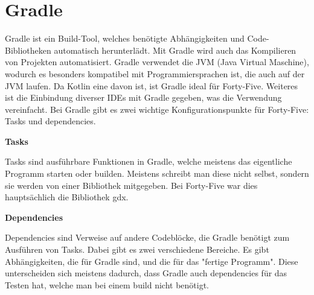 
\renewcommand{\kapitelautor}{Autor: Felix Zwickelstorfer}
\section{Gradle}\label{sec:gradle}

\renewcommand{\kapitelautor}{Autor: Felix Zwickelstorfer}

Gradle ist ein Build-Tool, welches benötigte Abhängigkeiten und Code-Bibliotheken automatisch herunterlädt.
Mit Gradle wird auch das Kompilieren von Projekten automatisiert.
Gradle verwendet die JVM (Java Virtual Maschine), wodurch es besonders kompatibel mit Programmiersprachen ist, die auch auf der JVM laufen.
Da Kotlin eine davon ist, ist Gradle ideal für Forty-Five.
Weiteres ist die Einbindung diverser IDEs mit Gradle gegeben, was die Verwendung vereinfacht.
Bei Gradle gibt es zwei wichtige Konfigurationspunkte für Forty-Five: Tasks und dependencies.

\textbf{Tasks}

Tasks sind ausführbare Funktionen in Gradle, welche meistens das eigentliche Programm starten oder builden.
Meistens schreibt man diese nicht selbst, sondern sie werden von einer Bibliothek mitgegeben.
Bei Forty-Five war dies hauptsächlich die Bibliothek gdx.

\textbf{Dependencies}

Dependencies sind Verweise auf andere Codeblöcke, die Gradle benötigt zum Ausführen von Tasks.
Dabei gibt es zwei verschiedene Bereiche.
Es gibt Abhängigkeiten, die für Gradle sind, und die für das "fertige Programm".
Diese unterscheiden sich meistens dadurch, dass Gradle auch dependencies für das Testen hat, welche man bei einem build nicht benötigt.\cite{gradleHomePage}


